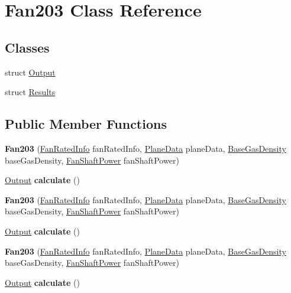 \hypertarget{class_fan203}{}\section{Fan203 Class Reference}
\label{class_fan203}
\subsection*{Classes}
\begin{DoxyCompactItemize}
\item 
struct \hyperlink{struct_fan203_1_1_output}{Output}
\item 
struct \hyperlink{struct_fan203_1_1_results}{Results}
\end{DoxyCompactItemize}
\subsection*{Public Member Functions}
\begin{DoxyCompactItemize}
\item 
\mbox{\label{class_fan203_a1bfc0312472778af52324d9245a8b121}} 
{\bfseries Fan203} (\hyperlink{class_fan_rated_info}{Fan\+Rated\+Info} fan\+Rated\+Info, \hyperlink{class_plane_data}{Plane\+Data} plane\+Data, \hyperlink{class_base_gas_density}{Base\+Gas\+Density} base\+Gas\+Density, \hyperlink{class_fan_shaft_power}{Fan\+Shaft\+Power} fan\+Shaft\+Power)
\item 
\mbox{\label{class_fan203_a74256a8964735afeaf3800d52b92e551}} 
\hyperlink{struct_fan203_1_1_output}{Output} {\bfseries calculate} ()
\item 
\mbox{\label{class_fan203_a1bfc0312472778af52324d9245a8b121}} 
{\bfseries Fan203} (\hyperlink{class_fan_rated_info}{Fan\+Rated\+Info} fan\+Rated\+Info, \hyperlink{class_plane_data}{Plane\+Data} plane\+Data, \hyperlink{class_base_gas_density}{Base\+Gas\+Density} base\+Gas\+Density, \hyperlink{class_fan_shaft_power}{Fan\+Shaft\+Power} fan\+Shaft\+Power)
\item 
\mbox{\label{class_fan203_a74256a8964735afeaf3800d52b92e551}} 
\hyperlink{struct_fan203_1_1_output}{Output} {\bfseries calculate} ()
\item 
\mbox{\label{class_fan203_a1bfc0312472778af52324d9245a8b121}} 
{\bfseries Fan203} (\hyperlink{class_fan_rated_info}{Fan\+Rated\+Info} fan\+Rated\+Info, \hyperlink{class_plane_data}{Plane\+Data} plane\+Data, \hyperlink{class_base_gas_density}{Base\+Gas\+Density} base\+Gas\+Density, \hyperlink{class_fan_shaft_power}{Fan\+Shaft\+Power} fan\+Shaft\+Power)
\item 
\mbox{\label{class_fan203_a74256a8964735afeaf3800d52b92e551}} 
\hyperlink{struct_fan203_1_1_output}{Output} {\bfseries calculate} ()
\end{DoxyCompactItemize}


